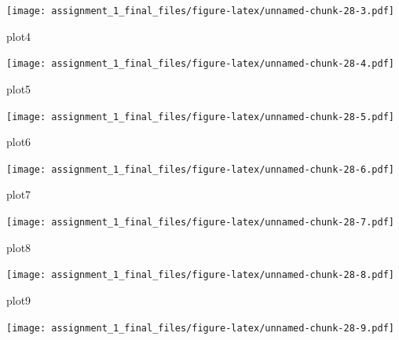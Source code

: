 \documentclass[
]{article}
\newenvironment{Shaded}{\begin{snugshade}}{\end{snugshade}}
\newcommand{\NormalTok}[1]{#1}
\begin{document}
\texttt{[image: assignment\_1\_final\_files/figure-latex/unnamed-chunk-28-3.pdf]}

\begin{Shaded}
\begin{Highlighting}[]
\NormalTok{plot4}
\end{Highlighting}
\end{Shaded}

\texttt{[image: assignment\_1\_final\_files/figure-latex/unnamed-chunk-28-4.pdf]}

\begin{Shaded}
\begin{Highlighting}[]
\NormalTok{plot5}
\end{Highlighting}
\end{Shaded}

\texttt{[image: assignment\_1\_final\_files/figure-latex/unnamed-chunk-28-5.pdf]}

\begin{Shaded}
\begin{Highlighting}[]
\NormalTok{plot6}
\end{Highlighting}
\end{Shaded}

\texttt{[image: assignment\_1\_final\_files/figure-latex/unnamed-chunk-28-6.pdf]}

\begin{Shaded}
\begin{Highlighting}[]
\NormalTok{plot7}
\end{Highlighting}
\end{Shaded}

\texttt{[image: assignment\_1\_final\_files/figure-latex/unnamed-chunk-28-7.pdf]}

\begin{Shaded}
\begin{Highlighting}[]
\NormalTok{plot8}
\end{Highlighting}
\end{Shaded}

\texttt{[image: assignment\_1\_final\_files/figure-latex/unnamed-chunk-28-8.pdf]}

\begin{Shaded}
\begin{Highlighting}[]
\NormalTok{plot9}
\end{Highlighting}
\end{Shaded}

\texttt{[image: assignment\_1\_final\_files/figure-latex/unnamed-chunk-28-9.pdf]}
\end{document}
